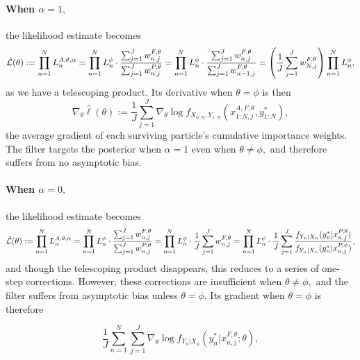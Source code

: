 \documentclass{article}
\begin{document}

\paragraph{When $\alpha=1,$} the likelihood estimate becomes
\begin{equation}
    \hat{\mathcal{L}}(\theta) := \prod_{n=1}^N L_n^{A, \theta, \alpha} = \prod_{n=1}^N L_n^\phi \cdot \frac{\sum_{j=1}^J w_{n,j}^{F,\theta}}{\sum_{j=1}^J w_{n,j}^{P,\theta}} = \prod_{n=1}^N L_n^\phi \cdot \frac{\sum_{j=1}^J w_{n,j}^{F,\theta}}{\sum_{j=1}^J w_{n-1,j}^{F,\theta}} = \left(\frac{1}{J}\sum_{j=1}^J w_{N,j}^{F,\theta}\right) \prod_{n=1}^N L_n^\phi,
\end{equation}
as we have a telescoping product. Its derivative when $\theta=\phi$ is then
\begin{equation}
    \nabla_\theta \hat{\ell}(\theta) := 
        \frac{1}{J}\sum_{j=1}^J \nabla_\theta \log f_{X_{0:N}, Y_{1:N}}(x_{1:N,j}^{A, F,\theta}, y_{1:N}^*),
\end{equation}
the average gradient of each surviving particle's cumulative importance weights. The filter targets the posterior when $\alpha=1$ even when $\theta \neq \phi,$ and therefore suffers from no asymptotic bias. 

\paragraph{When $\alpha=0,$} the likelihood estimate becomes
\begin{equation}
    \hat{\mathcal{L}}(\theta) := \prod_{n=1}^N L_n^{A, \theta, \alpha} = \prod_{n=1}^N L_n^\phi \cdot \frac{\sum_{j=1}^J w_{n,j}^{F,\theta}}{\sum_{j=1}^J w_{n,j}^{P,\theta}} = \prod_{n=1}^N L_n^\phi \cdot \frac{1}{J}\sum_{j=1}^J w_{n,j}^{F,\theta} = \prod_{n=1}^N L_n^\phi \cdot \frac{1}{J}\sum_{j=1}^J \frac{f_{Y_n|X_n}(y_n^*|x_{n,j}^{P, \theta})}{f_{Y_n|X_n}(y_n^*|x_{n,j}^{P, \phi})},
\end{equation}
and though the telescoping product disappears, this reduces to a series of one-step corrections. However, these corrections are insufficient when $\theta \neq \phi,$ and the filter suffers from asymptotic bias unless $\theta=\phi.$ Its gradient when $\theta=\phi$ is therefore

    \begin{equation}
        \frac{1}{J} \sum_{n=1}^N \sum_{j=1}^J \nabla_\theta \log f_{Y_n|X_{n}}(y_n^*|x_{n,j}^{F, \theta}; \theta),
    \end{equation}
\end{document}
